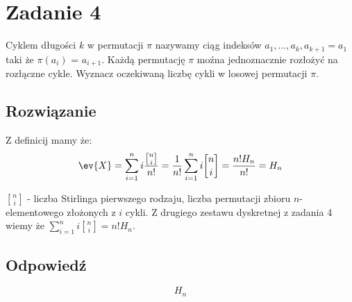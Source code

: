 \section{Zadanie 4}

Cyklem długości \(k\) w permutacji \(\pi\) nazywamy ciąg indeksów \(a_{1},\dots,a_{k},a_{k+1} = a_{1}\)
taki że \(\pi(a_{i})\) = \(a_{i+1}\). Każdą permutację \(\pi\) moźna jednoznacznie rozłożyć na rozłączne
cykle. Wyznacz oczekiwaną liczbę cykli w losowej permutacji \(\pi\).

\subsection*{Rozwiązanie}
Z definicij mamy że:
\[\ev{X} = \sum_{i=1}^{n}i\frac{{ n\brack i}}{n!} = \frac{1}{n!}\sum_{i=1}^{n}i{ n\brack i} = \frac{n!H_{n}}{n!} = H_{n}\]

\({n\brack i}\) - liczba Stirlinga pierwszego rodzaju, liczba permutacji zbioru \(n\)-elementowego złożonych z \(i\) cykli.
Z drugiego zestawu dyskretnej z zadania 4 wiemy że \(\sum_{i=1}^{n}i{ n\brack i} = n!H_{n}\).

\subsection*{Odpowiedź}
\[
	\boxed{\text{\(H_{n}\)}}
\]
